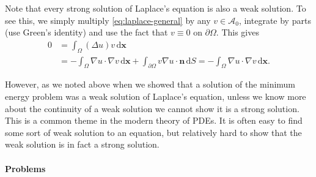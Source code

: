Note that every strong solution of Laplace's equation is also a weak solution. To see this, we simply multiply \eqref{eq:laplace-general} by any $v\in\mathcal{A}_0$, integrate by parts (use Green's identity) and use the fact that $v\equiv0$ on $\partial\Omega$. This gives
\begin{equation}\label{eq:strong-to-weak-green-identity}
\begin{aligned}
0&=\int_\Omega(\Delta u)v\,\mathrm{d}\bm{x}\\
&=-\int_\Omega\nabla u\cdot\nabla v\,\mathrm{d}\bm{x}
+\int_{\partial\Omega}v\nabla u\cdot\bm{n}\,\mathrm{d}S
=-\int_\Omega\nabla u\cdot\nabla v\,\mathrm{d}\bm{x}.
\end{aligned}
\end{equation}


However, as we noted above when we showed that a solution of the minimum energy problem was a weak solution of Laplace's equation, unless we know more about the continuity of a weak solution we cannot show it is a strong solution. This is a common theme in the modern theory of PDEs. It is often easy to find some sort of weak solution to an equation, but relatively hard to show that the weak solution is in fact a strong solution.

\paragraph*{Problems}

